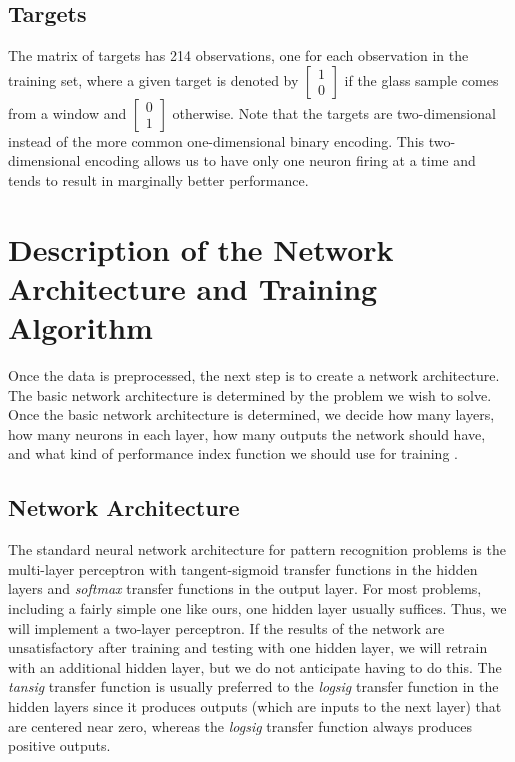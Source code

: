 \documentclass[12pt,halfline,a4paper]{ouparticle}
\begin{document}
\subsection{Targets}
\label{sec3.2}
The matrix of targets has 214 observations, one for each observation in the training set, where a given target is denoted by $\begin{bmatrix} 1 \\ 0 \end{bmatrix}$ if the glass sample comes from a window and $\begin{bmatrix} 0 \\ 1 \end{bmatrix}$ otherwise. Note that the targets are two-dimensional instead of the more common one-dimensional binary encoding. This two-dimensional encoding allows us to have only one neuron firing at a time and tends to result in marginally better performance. 

\section{Description of the Network Architecture and Training Algorithm}
\label{sec4}
Once the data is preprocessed, the next step is to create a network architecture. The basic network architecture is determined by the problem we wish to solve. Once the basic network architecture is determined, we decide how many layers, how many neurons in each layer, how many outputs the network should have, and what kind of performance index function we should use for training \cite{hagan2014}. 

\subsection{Network Architecture}
\label{sec4.1}
The standard neural network architecture for pattern recognition problems is the multi-layer perceptron with tangent-sigmoid transfer functions in the hidden layers and \emph{softmax} transfer functions in the output layer. For most problems, including a fairly simple one like ours, one hidden layer usually suffices. Thus, we will implement a two-layer perceptron. If the results of the network are unsatisfactory after training and testing with one hidden layer, we will retrain with an additional hidden layer, but we do not anticipate having to do this. The \emph{tansig} transfer function is usually preferred to the \emph{logsig} transfer function in the hidden layers since it produces outputs (which are inputs to the next layer) that are centered near zero, whereas the \emph{logsig} transfer function always produces positive outputs. 
\end{document}
